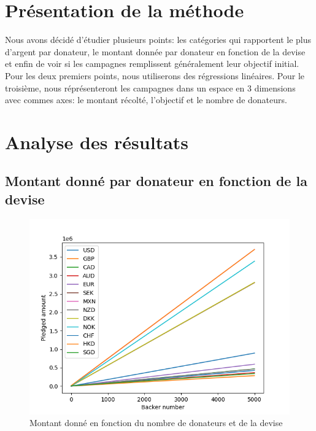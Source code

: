 \documentclass{article}
\begin{document}
\section{Présentation de la méthode}
\label{methode}
\tabto{1cm} Nous avons décidé d'étudier plusieurs points: les catégories qui rapportent le plus d'argent par donateur, le montant donnée par donateur en fonction de la devise et enfin de voir si les campagnes remplissent généralement leur objectif initial.
\tabto{1cm}Pour les deux premiers points, nous utiliserons des régressions linéaires. 
\tabto{1cm} Pour le troisième, nous réprésenteront les campagnes dans un espace en 3 dimensions avec commes axes: le montant récolté, l'objectif et le nombre de donateurs.
\section{Analyse des résultats}
\label{analyse}

\subsection{Montant donné par donateur en fonction de la devise}
\label{devise}
\begin{figure}[htbp]
    \graphicspath{{graph/}} 
    \centerline{\includegraphics[scale=0.5]{currency_comparison}}
    \caption{Montant donné en fonction du nombre de donateurs et de la devise}
    \label{fig_devise}
\end{figure}
\end{document}

